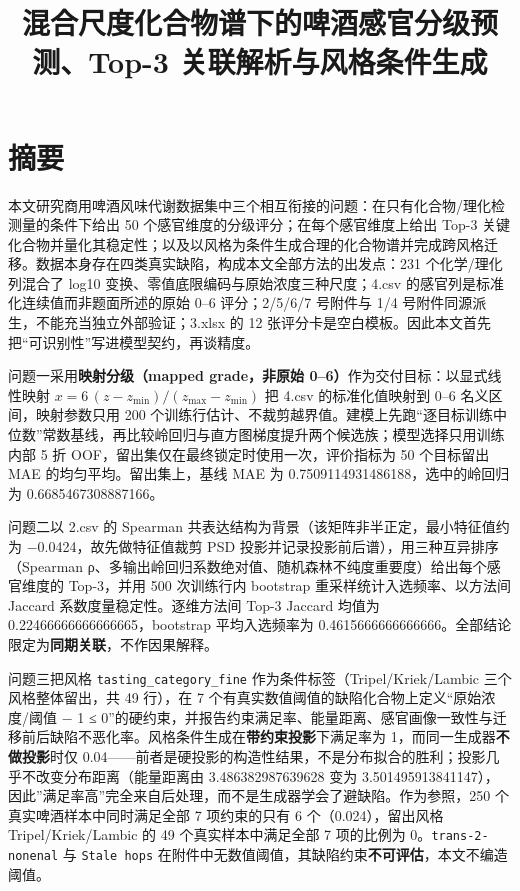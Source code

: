 \documentclass[
  11pt,
]{ctexart}
\title{混合尺度化合物谱下的啤酒感官分级预测、Top-3
关联解析与风格条件生成}
\author{}
\date{}
\newcounter{none} %
\begin{document}
\maketitle

\section{摘要}\label{ux6458ux8981}

本文研究商用啤酒风味代谢数据集中三个相互衔接的问题：在只有化合物/理化检测量的条件下给出
50 个感官维度的分级评分；在每个感官维度上给出 Top-3
关键化合物并量化其稳定性；以及以风格为条件生成合理的化合物谱并完成跨风格迁移。数据本身存在四类真实缺陷，构成本文全部方法的出发点：231
个化学/理化列混合了 log10 变换、零值底限编码与原始浓度三种尺度；4.csv
的感官列是标准化连续值而非题面所述的原始 0--6 评分；2/5/6/7 号附件与 1/4
号附件同源派生，不能充当独立外部验证；3.xlsx 的 12
张评分卡是空白模板。因此本文首先把``可识别性''写进模型契约，再谈精度。

问题一采用\textbf{映射分级（mapped grade，非原始
0--6）}作为交付目标：以显式线性映射
\(x = 6\,(z-z_{\min})/(z_{\max}-z_{\min})\) 把 4.csv 的标准化值映射到
0--6 名义区间，映射参数只用 200
个训练行估计、不裁剪越界值。建模上先跑``逐目标训练中位数''常数基线，再比较岭回归与直方图梯度提升两个候选族；模型选择只用训练内部
5 折 OOF，留出集仅在最终锁定时使用一次，评价指标为 50 个目标留出 MAE
的均匀平均。留出集上，基线 MAE 为 0.7509114931486188，选中的岭回归为
0.6685467308887166。

问题二以 2.csv 的 Spearman
共表达结构为背景（该矩阵非半正定，最小特征值约为
−0.0424，故先做特征值裁剪 PSD
投影并记录投影前后谱），用三种互异排序（\textbar Spearman
ρ\textbar、多输出岭回归系数绝对值、随机森林不纯度重要度）给出每个感官维度的
Top-3，并用 500 次训练行内 bootstrap 重采样统计入选频率、以方法间
Jaccard 系数度量稳定性。逐维方法间 Top-3 Jaccard 均值为
0.22466666666666665，bootstrap 平均入选频率为
0.4615666666666666。全部结论限定为\textbf{同期关联}，不作因果解释。

问题三把风格 \texttt{tasting\_\allowbreak{}category\_\allowbreak{}fine}
作为条件标签（Tripel/Kriek/Lambic 三个风格整体留出，共 49 行），在 7
个有真实数值阈值的缺陷化合物上定义``原始浓度/阈值 − 1 ≤
0''的硬约束，并报告约束满足率、能量距离、感官画像一致性与迁移前后缺陷不恶化率。风格条件生成在\textbf{带约束投影}下满足率为
1，而同一生成器\textbf{不做投影}时仅
0.04------前者是硬投影的构造性结果，不是分布拟合的胜利；投影几乎不改变分布距离（能量距离由
3.486382987639628 变为
3.501495913841147），因此''满足率高''完全来自后处理，而不是生成器学会了避缺陷。作为参照，250
个真实啤酒样本中同时满足全部 7 项约束的只有 6 个（0.024），留出风格
Tripel/Kriek/Lambic 的 49 个真实样本中满足全部 7 项的比例为
0。\texttt{trans-2-nonenal} 与 \texttt{Stale\ hops}
在附件中无数值阈值，其缺陷约束\textbf{不可评估}，本文不编造阈值。
\end{document}
